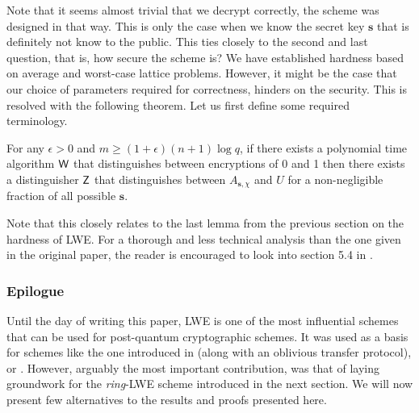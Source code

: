 Note that it seems almost trivial that we decrypt correctly, the scheme was designed in that way. This is only the case when we know the secret key $\bm{s}$ that is definitely not know to the public. This ties closely to the second and last question, that is, how secure the scheme is? We have established hardness based on average and worst-case lattice problems. However, it might be the case that our choice of parameters required for correctness, hinders on the security. This is resolved with the following theorem. Let us first define some required terminology.

\begin{proposition}
    For any $\epsilon > 0$ and $m \geq (1 + \epsilon)(n + 1) \log q$, if there exists a polynomial time algorithm $\alg{W}$ that distinguishes between encryptions of 0 and 1 then there exists a distinguisher $\alg{Z}$ that distinguishes between $A_{\bm{s}, \chi}$ and $U$ for a non-negligible fraction of all possible $\bm{s}$.
\end{proposition}
Note that this closely relates to the last lemma from the previous section on the hardness of LWE. For a thorough and less technical analysis than the one given in the original paper, the reader is encouraged to look into section 5.4 in \cite{Micci2009}.

\subsubsection*{Epilogue}
Until the day of writing this paper, LWE is one of the most influential schemes that can be used for post-quantum cryptographic schemes. It was used as a basis for schemes like the one introduced in \cite{ot-lwe} (along with an oblivious transfer protocol), \cite{lwe-scheme1} or \cite{lwe-scheme2}. However, arguably the most important contribution, was that of laying groundwork for the \textit{ring}-LWE scheme introduced in the next section. We will now present few alternatives to the results and proofs presented here.\\

\iffalse
Let us begin with the proof of the main theorem, namely, the quantum part. At some point, we would like to find entirely \textit{classical} and efficient reduction algorithm that proves the hardness of the problem. This is because we understand classical computation in much more detail than its quantum equivalent. Using classical computers we have cracked Enigma and landed on the moon. In the meantime, only recently a factorization of the integer 15 was achieved on a quantum computer using Shor's algorithm - see \krzys{find source of that statement}. Returning to the reduction problem, Chris Peikert in his paper \cite{peikert_classical} from 2009 has done exactly this. However, it was done in a somewhat ``inefficient'' way. That is, exponentially many samples are needed in the classical reduction compared to polynomial amount in the quantum version. For more details see the paper by Peikert and compare it with the original approach from Regev. It remains an important open question \krzys{also not sure about that} till this day, if the reduction can be made efficiently fully classical.
\fi
